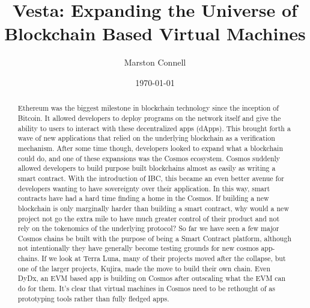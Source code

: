 \documentclass[a4paper]{article}
\begin{document}
\title{Vesta: Expanding the Universe of Blockchain Based Virtual Machines}

\author{Marston Connell}

\date{\today}


\maketitle
\newpage


\begin{abstract}
    Ethereum was the biggest milestone in blockchain technology since the inception of Bitcoin. It allowed developers to deploy programs on the network itself and give the ability to users to interact with these decentralized apps (dApps). This brought forth a wave of new applications that relied on the underlying blockchain as a verification mechanism. After some time though, developers looked to expand what a blockchain could do, and one of these expansions was the Cosmos ecosystem. Cosmos suddenly allowed developers to build purpose built blockchains almost as easily as writing a smart contract. With the introduction of IBC, this became an even better avenue for developers wanting to have sovereignty over their application. In this way, smart contracts have had a hard time finding a home in the Cosmos. If building a new blockchain is only marginally harder than building a smart contract, why would a new project not go the extra mile to have much greater control of their product and not rely on the tokenomics of the underlying protocol? So far we have seen a few major Cosmos chains be built with the purpose of being a Smart Contract platform, although not intentionally they have generally become testing grounds for new cosmos app-chains. If we look at Terra Luna, many of their projects moved after the collapse, but one of the larger projects, Kujira, made the move to build their own chain. Even DyDx, an EVM based app is building on Cosmos after outscaling what the EVM can do for them. It’s clear that virtual machines in Cosmos need to be rethought of as prototyping tools rather than fully fledged apps.
\end{abstract}

\newpage
\tableofcontents
\newpage
\end{document}
